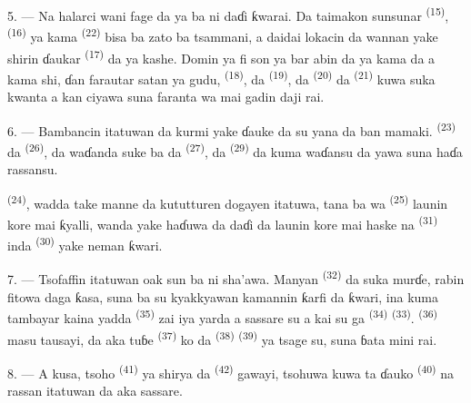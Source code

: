\VUsaut{3.0mm}
\VUsaut{3.0mm}

5. --- Na halarci  wani fage da ya ba ni daɗi ƙwarai.
Da taimakon sunsunar 
\textsuperscript{(15)},  \textsuperscript{(16)} ya
kama  \textsuperscript{(22)} bisa ba zato ba
tsammani, a daidai lokacin da wannan yake shirin ɗaukar  \textsuperscript{(17)} da ya kashe. Domin ya fi son ya bar abin da
ya kama da a kama shi, ɗan farautar satan ya gudu, 
\textsuperscript{(18)}, da  \textsuperscript{(19)}, da
 \textsuperscript{(20)} da 
\textsuperscript{(21)} kuwa suka kwanta a kan ciyawa suna faranta wa mai
gadin daji rai.

6. --- Bambancin itatuwan da kurmi yake ɗauke da su yana da ban
mamaki.  \textsuperscript{(23)} da
 \textsuperscript{(26)}, da
 waɗanda suke ba da 
\textsuperscript{(27)}, da  \textsuperscript{(29)} da
kuma waɗansu da yawa suna haɗa rassansu.

 \textsuperscript{(24)}, wadda take manne da
kututturen dogayen itatuwa, tana ba wa 
\textsuperscript{(25)} launin kore mai ƙyalli, wanda yake haɗuwa da daɗi
da launin kore mai haske na  \textsuperscript{(31)}
inda  \textsuperscript{(30)} yake neman
ƙwari.

\VUsaut{3.0mm}
\VUsaut{3.0mm}

7. --- Tsofaffin itatuwan oak sun ba ni sha’awa. Manyan
 \textsuperscript{(32)} da suka murɗe, rabin fitowa
daga ƙasa, suna ba su kyakkyawan kamannin ƙarfi da ƙwari, ina kuma
tambayar kaina yadda  \textsuperscript{(35)} zai iya
yarda a sassare su a kai su ga  \textsuperscript{(34)}
 \textsuperscript{(33)}. 
\textsuperscript{(36)} masu tausayi, da aka tuɓe 
\textsuperscript{(37)} ko da  \textsuperscript{(38)}
 \textsuperscript{(39)} ya tsage su, suna ɓata mini
rai.

8. --- A kusa, tsoho  \textsuperscript{(41)} ya
shirya da  \textsuperscript{(42)} gawayi,
tsohuwa kuwa ta ɗauko  \textsuperscript{(40)}
 na rassan itatuwan da aka sassare.

